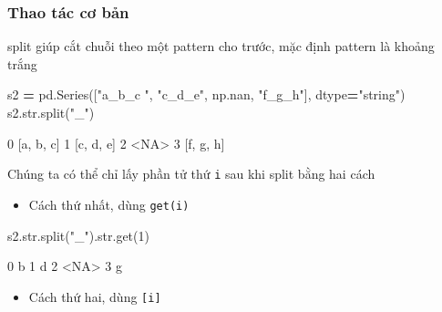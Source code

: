 \documentclass[
]{book}
\newenvironment{Shaded}{\begin{snugshade}}{\end{snugshade}}
\newcommand{\BuiltInTok}[1]{#1}
\newcommand{\DecValTok}[1]{\textcolor[rgb]{0.00,0.00,0.81}{#1}}
\newcommand{\NormalTok}[1]{#1}
\newcommand{\OperatorTok}[1]{\textcolor[rgb]{0.81,0.36,0.00}{\textbf{#1}}}
\newcommand{\StringTok}[1]{\textcolor[rgb]{0.31,0.60,0.02}{#1}}
\providecommand{\tightlist}{%
  \setlength{\itemsep}{0pt}\setlength{\parskip}{0pt}}
\begin{document}
\subsubsection*{Thao tác cơ bản}\label{thao-tuxe1c-cux1a1-bux1ea3n}


split giúp cắt chuỗi theo một pattern cho trước, mặc định pattern là khoảng trắng

\begin{Shaded}
\begin{Highlighting}[]
\NormalTok{s2 }\OperatorTok{=}\NormalTok{ pd.Series([}\StringTok{"a\_b\_c "}\NormalTok{, }\StringTok{"c\_d\_e"}\NormalTok{, np.nan, }\StringTok{"f\_g\_h"}\NormalTok{], dtype}\OperatorTok{=}\StringTok{"string"}\NormalTok{)}
\NormalTok{s2.}\BuiltInTok{str}\NormalTok{.split(}\StringTok{"\_"}\NormalTok{)​​}
\end{Highlighting}
\end{Shaded}

\begin{Shaded}
\begin{Highlighting}[]
\NormalTok{0    [a, b, c]​}
\NormalTok{1    [c, d, e]​}
\NormalTok{2         \textless{}NA\textgreater{}​}
\NormalTok{3    [f, g, h]​}
\end{Highlighting}
\end{Shaded}

Chúng ta có thể chỉ lấy phần tử thứ \texttt{i} sau khi split bằng hai cách

\begin{itemize}
\tightlist
\item
  Cách thứ nhất, dùng \texttt{get(i)}
\end{itemize}

\begin{Shaded}
\begin{Highlighting}[]
\NormalTok{s2.}\BuiltInTok{str}\NormalTok{.split(}\StringTok{"\_"}\NormalTok{).}\BuiltInTok{str}\NormalTok{.get(}\DecValTok{1}\NormalTok{)​}
\end{Highlighting}
\end{Shaded}

\begin{Shaded}
\begin{Highlighting}[]
\NormalTok{0       b​}
\NormalTok{1       d​}
\NormalTok{2    \textless{}NA\textgreater{}​}
\NormalTok{3       g}
\end{Highlighting}
\end{Shaded}

\begin{itemize}
\tightlist
\item
  Cách thứ hai, dùng \texttt{{[}i{]}}
\end{itemize}
\end{document}
